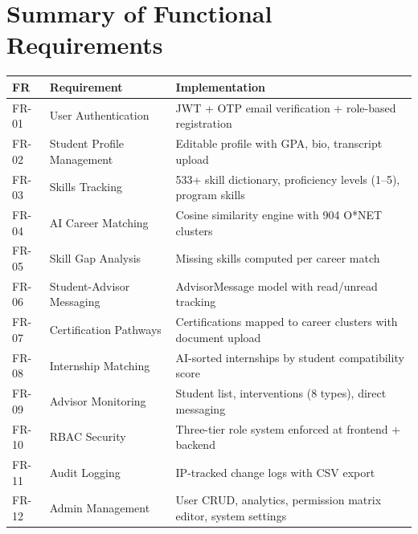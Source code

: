 \documentclass[12pt, a4paper]{article}
\begin{document}
\section{Summary of Functional Requirements}

\begin{longtable}{p{1.5cm}p{5cm}p{7.5cm}}
\toprule
\textbf{FR} & \textbf{Requirement} & \textbf{Implementation} \\
\midrule
\endhead
FR-01 & User Authentication & JWT + OTP email verification + role-based registration \\
FR-02 & Student Profile Management & Editable profile with GPA, bio, transcript upload \\
FR-03 & Skills Tracking & 533+ skill dictionary, proficiency levels (1--5), program skills \\
FR-04 & AI Career Matching & Cosine similarity engine with 904 O*NET clusters \\
FR-05 & Skill Gap Analysis & Missing skills computed per career match \\
FR-06 & Student-Advisor Messaging & AdvisorMessage model with read/unread tracking \\
FR-07 & Certification Pathways & Certifications mapped to career clusters with document upload \\
FR-08 & Internship Matching & AI-sorted internships by student compatibility score \\
FR-09 & Advisor Monitoring & Student list, interventions (8 types), direct messaging \\
FR-10 & RBAC Security & Three-tier role system enforced at frontend + backend \\
FR-11 & Audit Logging & IP-tracked change logs with CSV export \\
FR-12 & Admin Management & User CRUD, analytics, permission matrix editor, system settings \\
\bottomrule
\end{longtable}
\end{document}
